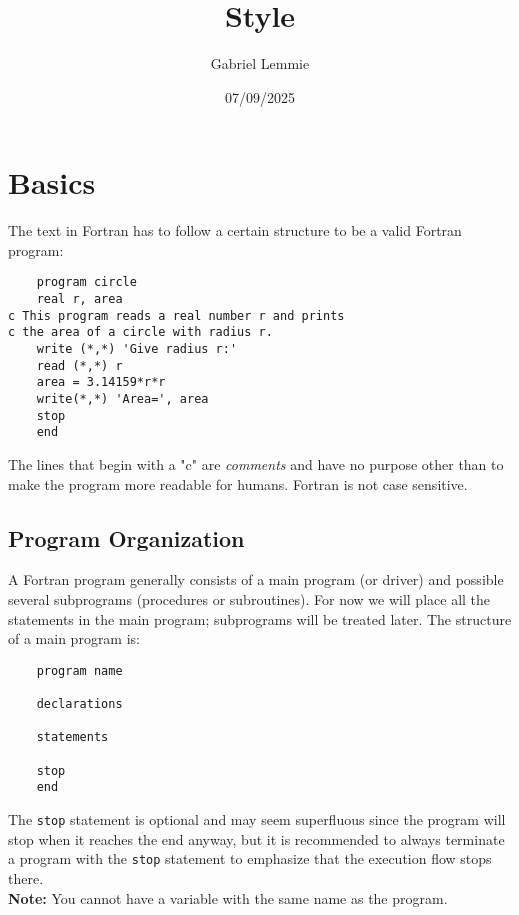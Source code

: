 \documentclass[oneside]{article}
\begin{document}
 
 \date{07/09/2025}

 
\title{Style}

\author{Gabriel Lemmie}

\maketitle

\section*{Basics}

The text in Fortran has to follow a certain structure to be a valid Fortran program:

\begin{lstlisting}
	program circle
	real r, area 
c This program reads a real number r and prints 
c the area of a circle with radius r.
	write (*,*) 'Give radius r:'
	read (*,*) r
	area = 3.14159*r*r
	write(*,*) 'Area=', area 		
	stop 
	end		
\end{lstlisting}

The lines that begin with a "c" are \textit{comments} and have no purpose other than to make the program more readable for humans. Fortran is not case sensitive.

\subsection*{Program Organization}

A Fortran program generally consists of a main program (or driver) and possible several subprograms (procedures or subroutines). For now we will place all the statements in the main program; subprograms will be treated later. The structure of a main program is: 

\begin{lstlisting}
	program name 
	
	declarations
	
	statements
	
	stop
	end
\end{lstlisting}

The \texttt{stop} statement is optional and may seem superfluous since the program will stop when it reaches the end anyway, but it is recommended to always terminate a program with the \texttt{stop} statement to emphasize that the execution flow stops there. \\

\textbf{Note:} You cannot have a variable with the same name as the program.
\end{document}
